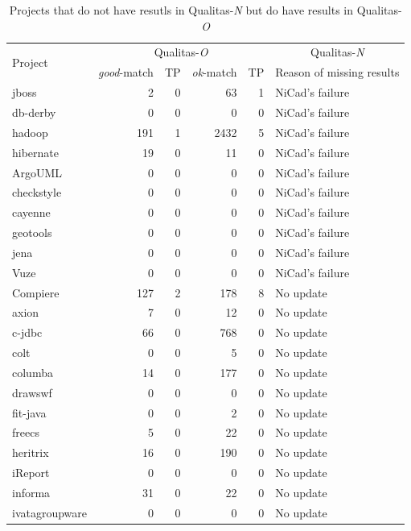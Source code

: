 \documentclass{IEEEtran}
\begin{document}
\begin{table}[H]
	\centering
	\caption{Projects that do not have resutls in Qualitas-\textit{N} but do have results in Qualitas-\textit{O}}
	\label{tab:tp_pairs}
	\begin{tabular}{l|r|r|r|r|p{5cm}}
	\hline
	\multirow{2}{*}{Project} & \multicolumn{4}{c|}{Qualitas-\textit{O}} & \multicolumn{1}{c}{Qualitas-\textit{N}} \\ \cline{2-6}
			& \textit{good}-match & TP & \textit{ok}-match & TP & Reason of missing results \\
	\hline
	jboss		& 2 	& 	0	& 63 	& 1 & NiCad's failure \\
	db-derby 	& 0 	&	0	& 0		& 0 & NiCad's failure \\
	hadoop		& 191 	& 1 	& 2432 	& 5 & NiCad's failure \\
	hibernate 	& 19 	& 	0	& 11 	& 0 & NiCad's failure \\
	ArgoUML		& 0		& 	0	& 0		& 0 & NiCad's failure \\
	checkstyle	& 0		&	0	& 0		& 0 & NiCad's failure \\
	cayenne		& 0		& 	0	& 0		& 0 & NiCad's failure \\
	geotools	& 0		& 	0	& 0		& 0 & NiCad's failure \\
	jena		& 0		& 	0	& 0		& 0 & NiCad's failure \\
	Vuze		& 0		&	0	& 0		& 0 & NiCad's failure \\
	Compiere	& 127	& 2		& 178	& 8 & No update \\
	axion		& 7		& 	0	& 12	& 0 & No update \\
	c-jdbc		& 66	&	0	& 768	& 0 & No update \\
	colt		& 0		& 	0	& 5		& 0 & No update \\
	columba		& 14	&	0	& 177	& 0 & No update \\
	drawswf		& 0		&	0	& 0		& 0 & No update \\
	fit-java	& 0		& 0		& 2 	& 0 & No update \\
	freecs		& 5		& 0		& 22	& 0 & No update \\
	heritrix	& 16	& 0		& 190 	& 0 & No update \\
	iReport		& 0		& 0 	& 0		& 0 & No update \\
	informa		& 31	& 0 	& 22	& 0 & No update \\
	ivatagroupware	& 0	& 0		& 0		& 0 & No update \\

\end{tabular}
\end{table}
\end{document}
